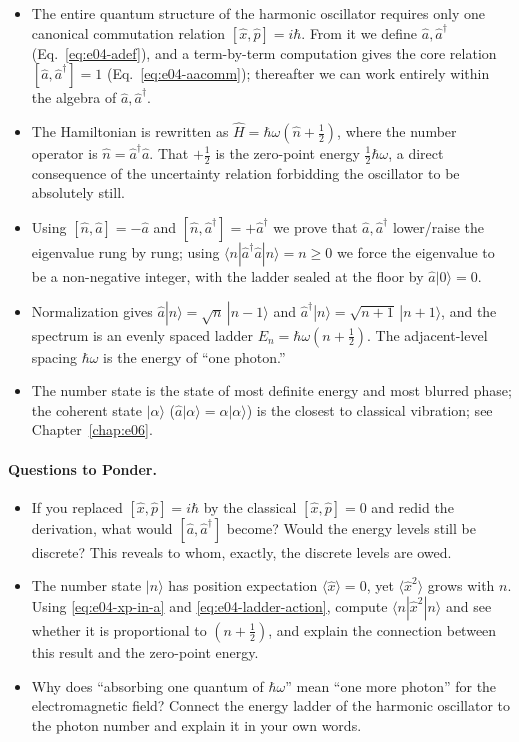 \begin{itemize}
  \item The entire quantum structure of the harmonic oscillator requires only one canonical commutation relation \([\hat x,\hat p]=i\hbar\). From it we define \(\hat a,\hat a^\dagger\) (Eq.~\eqref{eq:e04-adef}), and a term-by-term computation gives the core relation \([\hat a,\hat a^\dagger]=1\) (Eq.~\eqref{eq:e04-aacomm}); thereafter we can work entirely within the algebra of \(\hat a,\hat a^\dagger\).
  \item The Hamiltonian is rewritten as \(\hat H=\hbar\omega(\hat n+\tfrac12)\), where the number operator is \(\hat n=\hat a^\dagger\hat a\). That \(+\tfrac12\) is the zero-point energy \(\tfrac12\hbar\omega\), a direct consequence of the uncertainty relation forbidding the oscillator to be absolutely still.
  \item Using \([\hat n,\hat a]=-\hat a\) and \([\hat n,\hat a^\dagger]=+\hat a^\dagger\) we prove that \(\hat a,\hat a^\dagger\) lower/raise the eigenvalue rung by rung; using \(\langle n|\hat a^\dagger\hat a|n\rangle=n\ge0\) we force the eigenvalue to be a non-negative integer, with the ladder sealed at the floor by \(\hat a|0\rangle=0\).
  \item Normalization gives \(\hat a|n\rangle=\sqrt{n}\,|n-1\rangle\) and \(\hat a^\dagger|n\rangle=\sqrt{n+1}\,|n+1\rangle\), and the spectrum is an evenly spaced ladder \(E_n=\hbar\omega(n+\tfrac12)\). The adjacent-level spacing \(\hbar\omega\) is the energy of ``one photon.''
  \item The number state is the state of most definite energy and most blurred phase; the coherent state \(|\alpha\rangle\) (\(\hat a|\alpha\rangle=\alpha|\alpha\rangle\)) is the closest to classical vibration; see Chapter~\ref{chap:e06}.
\end{itemize}

\paragraph{Questions to Ponder.}
\begin{itemize}
  \item If you replaced \([\hat x,\hat p]=i\hbar\) by the classical \([\hat x,\hat p]=0\) and redid the derivation, what would \([\hat a,\hat a^\dagger]\) become? Would the energy levels still be discrete? This reveals to whom, exactly, the discrete levels are owed.
  \item The number state \(|n\rangle\) has position expectation \(\langle\hat x\rangle=0\), yet \(\langle\hat x^2\rangle\) grows with \(n\). Using \eqref{eq:e04-xp-in-a} and \eqref{eq:e04-ladder-action}, compute \(\langle n|\hat x^2|n\rangle\) and see whether it is proportional to \((n+\tfrac12)\), and explain the connection between this result and the zero-point energy.
  \item Why does ``absorbing one quantum of \(\hbar\omega\)'' mean ``one more photon'' for the electromagnetic field? Connect the energy ladder of the harmonic oscillator to the photon number and explain it in your own words.
\end{itemize}
